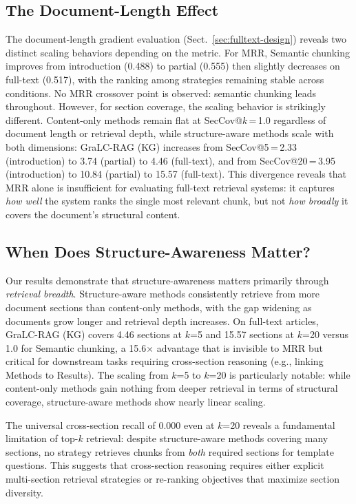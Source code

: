 \documentclass[sn-basic]{sn-jnl}
\newcommand{\gralcrag}{GraLC-RAG}
\begin{document}
\subsection{The Document-Length Effect}

The document-length gradient evaluation (Sect.~\ref{sec:fulltext-design}) reveals two distinct scaling behaviors depending on the metric. For MRR, Semantic chunking improves from introduction (0.488) to partial (0.555) then slightly decreases on full-text (0.517), with the ranking among strategies remaining stable across conditions. No MRR crossover point is observed: semantic chunking leads throughout. However, for section coverage, the scaling behavior is strikingly different. Content-only methods remain flat at SecCov@$k$\,=\,1.0 regardless of document length or retrieval depth, while structure-aware methods scale with both dimensions: \gralcrag{} (KG) increases from SecCov@5\,=\,2.33 (introduction) to 3.74 (partial) to 4.46 (full-text), and from SecCov@20\,=\,3.95 (introduction) to 10.84 (partial) to 15.57 (full-text). This divergence reveals that MRR alone is insufficient for evaluating full-text retrieval systems: it captures \emph{how well} the system ranks the single most relevant chunk, but not \emph{how broadly} it covers the document's structural content.

\subsection{When Does Structure-Awareness Matter?}

Our results demonstrate that structure-awareness matters primarily through \emph{retrieval breadth}. Structure-aware methods consistently retrieve from more document sections than content-only methods, with the gap widening as documents grow longer and retrieval depth increases. On full-text articles, \gralcrag{} (KG) covers 4.46 sections at $k$=5 and 15.57 sections at $k$=20 versus 1.0 for Semantic chunking, a 15.6$\times$ advantage that is invisible to MRR but critical for downstream tasks requiring cross-section reasoning (e.g., linking Methods to Results). The scaling from $k$=5 to $k$=20 is particularly notable: while content-only methods gain nothing from deeper retrieval in terms of structural coverage, structure-aware methods show nearly linear scaling.

The universal cross-section recall of 0.000 even at $k$=20 reveals a fundamental limitation of top-$k$ retrieval: despite structure-aware methods covering many sections, no strategy retrieves chunks from \emph{both} required sections for template questions. This suggests that cross-section reasoning requires either explicit multi-section retrieval strategies or re-ranking objectives that maximize section diversity.
\end{document}

